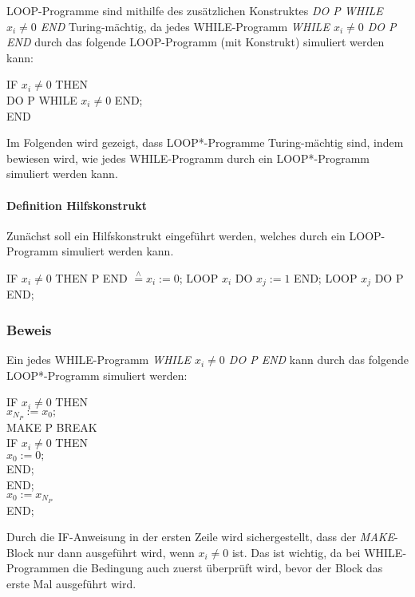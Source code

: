 \documentclass[10pt,leqno ]{article}
\newcommand{\estimates}{\overset{\scriptscriptstyle\wedge}{=}}
\begin{document}
LOOP-Programme sind mithilfe des zusätzlichen Konstruktes \textit{DO P WHILE  $x_i \neq 0$ END} Turing-mächtig, da jedes WHILE-Programm \textit{WHILE $x_i \neq 0$ DO P END} durch das folgende LOOP-Programm (mit Konstrukt) simuliert werden kann:

\begin{flushleft}
IF $x_i \neq 0$ THEN \\ 
\quad    DO P WHILE $x_i \neq 0$ END; \\ 
END
\end{flushleft}

Im Folgenden wird gezeigt, dass LOOP*-Programme Turing-mächtig sind, indem bewiesen wird, wie jedes WHILE-Programm durch ein LOOP*-Programm simuliert werden kann.


\paragraph{Definition Hilfskonstrukt}
Zunächst soll ein Hilfskonstrukt eingeführt werden, welches durch ein LOOP-Programm simuliert werden kann.
\begin{flushleft}
    IF $x_i \neq 0$ THEN P END $\estimates x_i := 0$; LOOP $x_i$ DO $x_j := 1$ END; LOOP $x_j$ DO P END;
\end{flushleft}

\subsubsection*{Beweis}
Ein jedes WHILE-Programm \textit{WHILE $x_i \neq 0$ DO P END} kann durch das folgende LOOP*-Programm simuliert werden:

\begin{flushleft}
    IF $x_i \neq 0$ THEN \\ 
    \quad $x_{N_P} := x_0;$ \\ 
    \quad MAKE P  BREAK \\
    \qquad IF $x_i \neq 0$ THEN \\ 
    \quad \qquad $x_0 := 0;$ \\
    \qquad END; \\
    \quad END; \\ 
    \quad $x_0 := x_{N_P}$ \\
    END;
\end{flushleft}

Durch die IF-Anweisung in der ersten Zeile wird sichergestellt, dass der \textit{MAKE}-Block nur dann ausgeführt wird, wenn $x_i \neq 0$ ist. Das ist wichtig, da bei WHILE-Programmen die Bedingung auch zuerst überprüft wird, bevor der Block das erste Mal ausgeführt wird.
\end{document}
